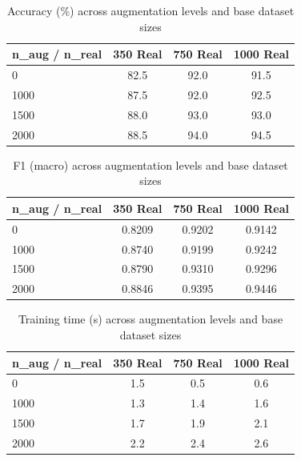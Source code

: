 \begin{table}[h]
        \centering
        \caption{Accuracy (\%) across augmentation levels and base dataset sizes}
        \label{tab:aug_accuracy}
        \begin{tabular}{|l|c|c|c|}
            \hline
            \textbf{n\_aug / n\_real} & \textbf{350 Real} & \textbf{750 Real} & \textbf{1000 Real} \\
            \hline
            0    & 82.5 & 92.0 & 91.5 \\
            1000 & 87.5 & 92.0 & 92.5 \\
            1500 & 88.0 & 93.0& 93.0 \\
            2000 & 88.5 & 94.0 & 94.5 \\
            \hline
        \end{tabular}
\end{table}

\begin{table}[h]
        \centering
        \caption{F1 (macro) across augmentation levels and base dataset sizes}
        \label{tab:aug_f1}
        \begin{tabular}{|l|c|c|c|}
            \hline
            \textbf{n\_aug / n\_real} & \textbf{350 Real} & \textbf{750 Real} & \textbf{1000 Real} \\
            \hline
            0    & 0.8209 & 0.9202 & 0.9142 \\
            1000 & 0.8740 & 0.9199 & 0.9242 \\
            1500 & 0.8790 & 0.9310 & 0.9296 \\
            2000 & 0.8846 & 0.9395 & 0.9446 \\
            \hline
        \end{tabular}
\end{table}

\begin{table}[h]
        \centering
        \caption{Training time (s) across augmentation levels and base dataset sizes}
        \label{tab:aug_time}
        \begin{tabular}{|l|c|c|c|}
            \hline
            \textbf{n\_aug / n\_real} & \textbf{350 Real} & \textbf{750 Real} & \textbf{1000 Real} \\
            \hline
            0    & 1.5 & 0.5 & 0.6 \\
            1000 & 1.3 & 1.4 & 1.6 \\
            1500 & 1.7 & 1.9 & 2.1 \\
            2000 & 2.2 & 2.4 & 2.6 \\
            \hline
        \end{tabular}
\end{table}

